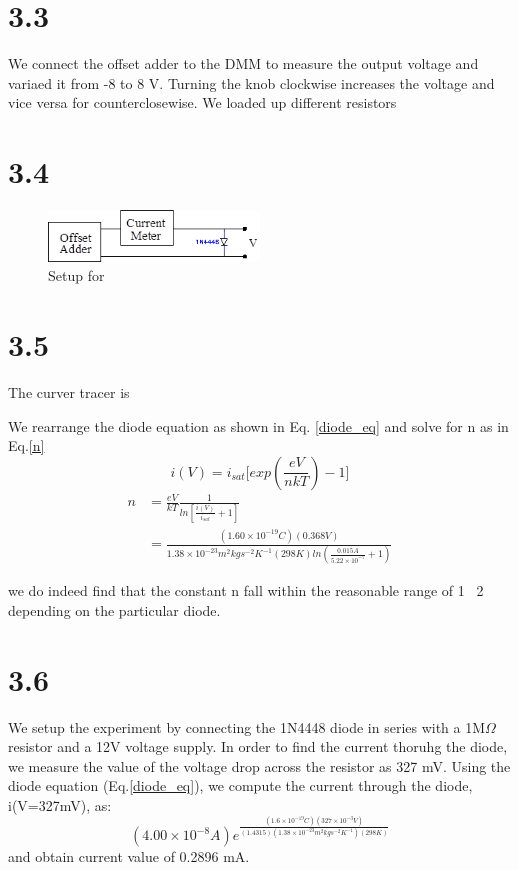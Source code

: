 \documentclass[authoryear, 12pt,5p, times]{elsarticle}
\begin{document}
\section*{3.3}
We connect the offset adder to the DMM to measure the output voltage and variaed it from -8 to 8 V. Turning the knob clockwise increases the voltage and vice versa for counterclosewise. We loaded up different resistors 
\section*{3.4}
\begin{figure}[h!]
\center
\includegraphics[width=0.5\textwidth]{figure/3_4_diag}
\caption{Setup for }
\label{3_4_diag}
\end{figure}
\section*{3.5}
The curver tracer is  

\par We rearrange the diode equation as shown in Eq. \ref{diode_eq} and solve for n as in Eq.\ref{n}
\begin{equation}
i(V) = i_{sat}\Bigg[exp(\frac{eV}{nkT})-1\Bigg]
\label{diode_eq}
\end{equation}
\begin{equation}
\begin{split}
n &= \frac{eV}{kT}\frac{1}{ln[\frac{i(V)}{i_{sat}}+1]} \\&= \frac{(1.60\times10^{-19}C)(0.368V)}{1.38\times10^{-23}m^2kgs^{-2}K^{-1}(298K)ln(\frac{0.015A}{5.22\times10^{-7}}+1)}
\label{n}
\end{split}
\end{equation}



we do indeed find that the constant n fall within the reasonable range of 1~ 2  depending on the particular diode.
\section*{3.6}
We setup the experiment by connecting the 1N4448 diode in series with a 1M$\Omega$ resistor and a 12V voltage supply. In order to find the current thoruhg the diode, we measure the value of the voltage drop across the resistor as 327 mV. Using the diode equation (Eq.\ref{diode_eq}), we compute the current through the diode, i(V=327mV), as: 
\begin{equation*}
(4.00\times10^{-8}A)e^{\frac{(1.6\times10^{-19}C)(327\times10^{-3}V)}{(1.4315)(1.38\times10^{-23}m^2kgs^{-2}K^{-1})(298K)}}
\end{equation*}
and obtain current value of 0.2896 mA.
\end{document}
